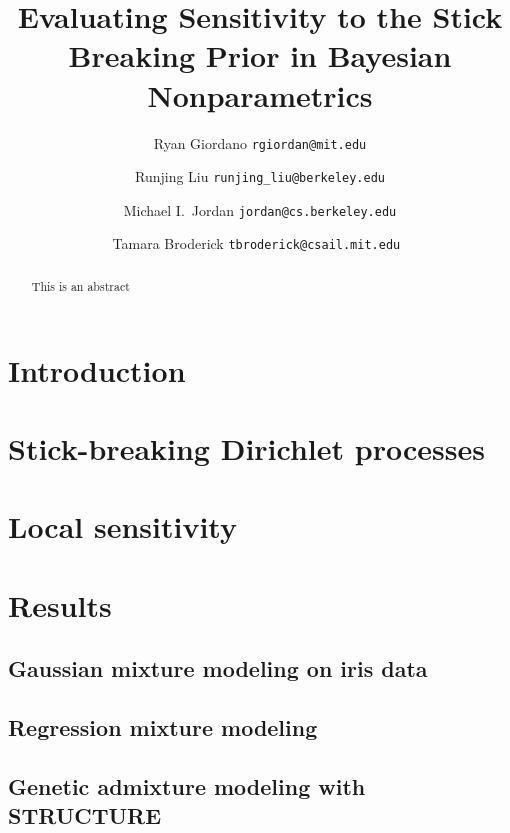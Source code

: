 \documentclass[twoside,11pt]{article}
\begin{document}
\title{Evaluating Sensitivity to the Stick Breaking Prior in Bayesian Nonparametrics}

\author{Ryan Giordano \texttt{rgiordan@mit.edu} \\
        \and
        Runjing Liu \texttt{runjing\_liu@berkeley.edu} \\
        \and
        Michael I.\ Jordan \texttt{jordan@cs.berkeley.edu} \\
        \and
        Tamara Broderick \texttt{tbroderick@csail.mit.edu }
        }

\maketitle

\begin{abstract}%
This is an abstract
\end{abstract}

\section{Introduction}\label{sec:introduction}



\section{Stick-breaking Dirichlet processes}


\section{Local sensitivity}



\section{Results}


\subsection{Gaussian mixture modeling on iris data}


\subsection{Regression mixture modeling}


\subsection{Genetic admixture modeling with STRUCTURE}

\end{document}
